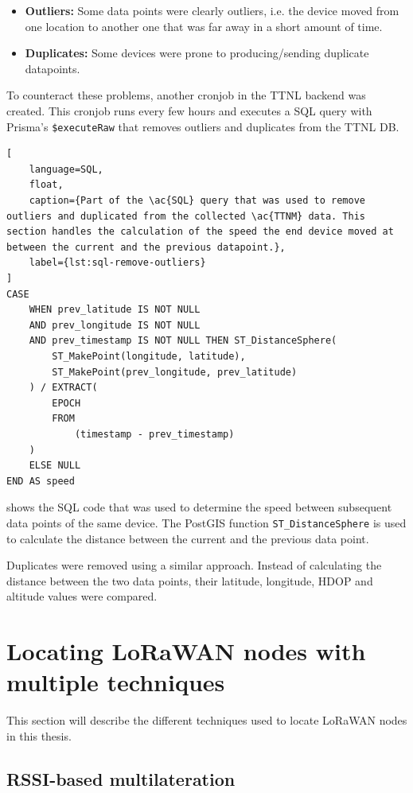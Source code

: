 \begin{itemize}
    \item \textbf{Outliers:} Some data points were clearly outliers, i.e. the device moved from one location to another one that was far away in a short amount of time.
    \item \textbf{Duplicates:} Some devices were prone to producing/sending duplicate datapoints.
\end{itemize}

To counteract these problems, another cronjob in the \ac{TTNL} backend was created.
This cronjob runs every few hours and executes a \ac{SQL} query with Prisma's \lstinline|$executeRaw| that removes outliers and duplicates from the \ac{TTNL} \ac{DB}.

\begin{lstlisting}[
    language=SQL,
    float,
    caption={Part of the \ac{SQL} query that was used to remove outliers and duplicated from the collected \ac{TTNM} data. This section handles the calculation of the speed the end device moved at between the current and the previous datapoint.},
    label={lst:sql-remove-outliers}
]
CASE
    WHEN prev_latitude IS NOT NULL
    AND prev_longitude IS NOT NULL
    AND prev_timestamp IS NOT NULL THEN ST_DistanceSphere(
        ST_MakePoint(longitude, latitude),
        ST_MakePoint(prev_longitude, prev_latitude)
    ) / EXTRACT(
        EPOCH
        FROM
            (timestamp - prev_timestamp)
    )
    ELSE NULL
END AS speed
\end{lstlisting}

 shows the \ac{SQL} code that was used to determine the speed between subsequent data points of the same device.
The PostGIS function \lstinline|ST_DistanceSphere| is used to calculate the distance between the current and the previous data point.

Duplicates were removed using a similar approach.
Instead of calculating the distance between the two data points, their latitude, longitude, \ac{HDOP} and altitude values were compared.

\section{Locating \acs{LoRaWAN} nodes with multiple techniques}

This section will describe the different techniques used to locate \ac{LoRaWAN} nodes in this thesis.

\subsection{\acs{RSSI}-based multilateration}

